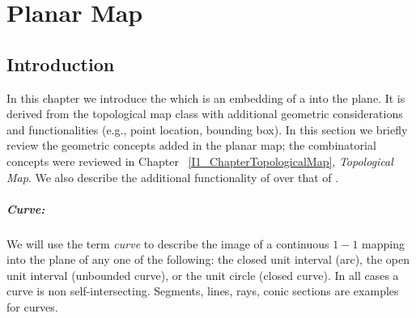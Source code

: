 
\def\Ipe#1{\def\IPEfile{#1}}

\renewcommand{\Re}{{\rm I\!\hspace{-0.025em} R}}

\def\C{{\cal C}}
\def\G{{\cal G}}
\def\F{{\cal F}}
\def\I{{\cal I}}
\def\U{{\cal U}}
\def\M{{\cal M}}
\def\eps{{\varepsilon}}
\def\bd{{\partial}}
\def\dm{{\cal D}}

\chapter{Planar Map}
\label{I1_ChapterPlanarMap}

\section{Introduction}
\label{PM_sec:intro}

In this chapter we introduce the  which is an
embedding of a  into the plane.
It is derived
from the topological map class with additional geometric considerations
and functionalities (e.g., point location, bounding box). 
In this section we briefly review
the geometric concepts added in the planar map; the combinatorial concepts were
reviewed in Chapter ~\ref{I1_ChapterTopologicalMap}, {\em Topological Map}.
We also describe the additional functionality of 
over that of .

\paragraph{Curve:}
We will use the term {\it curve} to describe the image of a continuous
$1\!\!-\!\!1$ mapping into the plane of any one of the following: the
closed unit interval (arc), the open unit interval (unbounded curve),
or the unit circle (closed curve). In all cases a curve is non
self-intersecting. Segments, lines, rays, conic sections are examples for curves.

